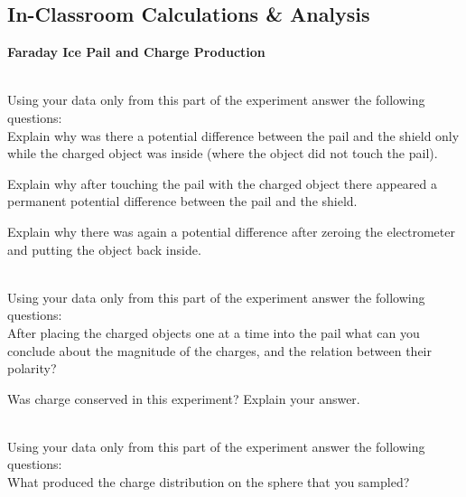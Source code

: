 {{{\subsection{In-Classroom Calculations \& Analysis}
{\bf{Faraday Ice Pail and Charge Production}}\\
\vspace{0.2cm}

\\
 \noindent Using your data only from this part of the
experiment answer the following questions:\\

\noindent Explain why was there a potential difference between the
pail and the shield only while the charged object was inside
(where the object did not touch the pail).\\
\vspace{5cm}


\noindent Explain why after touching the pail with the charged
object there appeared a permanent potential difference between the pail and the shield.\\
\vspace{5cm}

\noindent Explain why there was again a potential difference after zeroing the electrometer and putting the object back inside. \\ %
\vspace{5cm}

\\
Using your data only from this part of the experiment answer the
following questions:\\
\noindent After placing the charged objects one at a time into the
pail what can you conclude about the magnitude of the charges, and
the relation between their polarity?\\

\vspace{5cm}

\noindent Was charge conserved in this experiment? Explain your answer.\\
\vspace{4cm}

\\
\noindent Using your data only from this part of the experiment
answer the
following questions:\\
\noindent What produced the charge distribution on the sphere that
you sampled?\\
\vspace{3cm}

}}}
